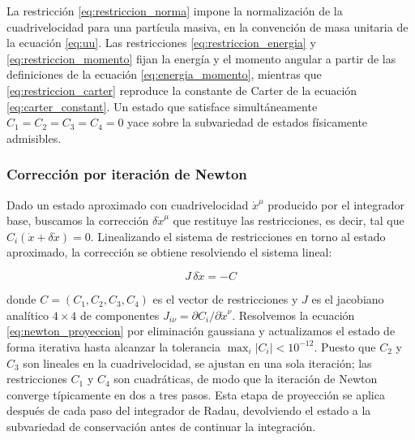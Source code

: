 La restricción \eqref{eq:restriccion_norma} impone la normalización de la cuadrivelocidad para una partícula masiva, en la convención de masa unitaria de la ecuación \eqref{eq:uu}. Las restricciones \eqref{eq:restriccion_energia} y \eqref{eq:restriccion_momento} fijan la energía y el momento angular a partir de las definiciones de la ecuación \eqref{eq:energia_momento}, mientras que \eqref{eq:restriccion_carter} reproduce la constante de Carter de la ecuación \eqref{eq:carter_constant}. Un estado que satisface simultáneamente $C_1 = C_2 = C_3 = C_4 = 0$ yace sobre la subvariedad de estados físicamente admisibles.

\subsubsection{Corrección por iteración de Newton}

Dado un estado aproximado con cuadrivelocidad $\dot{x}^\mu$ producido por el integrador base, buscamos la corrección $\delta \dot{x}^\mu$ que restituye las restricciones, es decir, tal que $C_i(\dot{x} + \delta \dot{x}) = 0$. Linealizando el sistema de restricciones en torno al estado aproximado, la corrección se obtiene resolviendo el sistema lineal:

\begin{equation}
    J\, \delta \dot{x} = -C \label{eq:newton_proyeccion}
\end{equation}

donde $C = (C_1, C_2, C_3, C_4)$ es el vector de restricciones y $J$ es el jacobiano analítico $4 \times 4$ de componentes $J_{i\nu} = \partial C_i / \partial \dot{x}^\nu$. Resolvemos la ecuación \eqref{eq:newton_proyeccion} por eliminación gaussiana y actualizamos el estado de forma iterativa hasta alcanzar la tolerancia $\max_i |C_i| < 10^{-12}$. Puesto que $C_2$ y $C_3$ son lineales en la cuadrivelocidad, se ajustan en una sola iteración; las restricciones $C_1$ y $C_4$ son cuadráticas, de modo que la iteración de Newton converge típicamente en dos a tres pasos. Esta etapa de proyección se aplica después de cada paso del integrador de Radau, devolviendo el estado a la subvariedad de conservación antes de continuar la integración.


